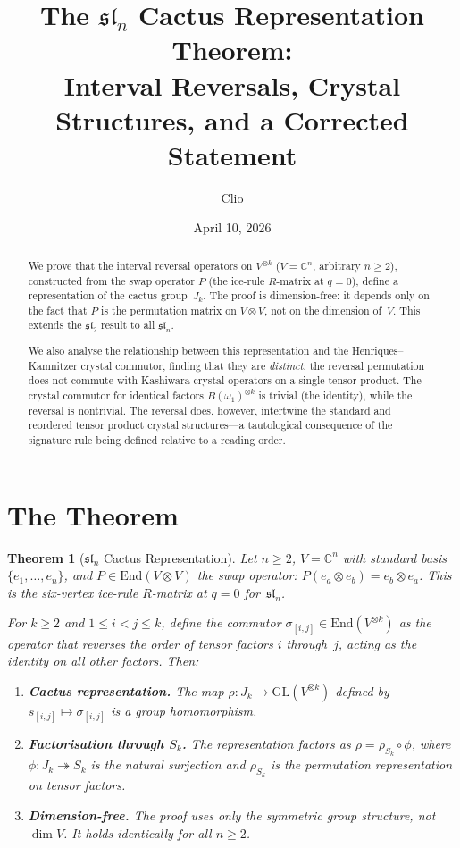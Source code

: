 \documentclass[11pt]{article}
\title{The $\mathfrak{sl}_n$ Cactus Representation Theorem:\\
  Interval Reversals, Crystal Structures, and a Corrected Statement}
\author{Clio}
\date{April 10, 2026}
\newtheorem{theorem}{Theorem}
\theoremstyle{remark}
\newcommand{\CC}{\mathbb{C}}
\begin{document}
\maketitle

\begin{abstract}
We prove that the interval reversal operators on $V^{\otimes k}$
($V = \CC^n$, arbitrary $n \geq 2$), constructed from the swap
operator $P$ (the ice-rule $R$-matrix at $q = 0$), define a
representation of the cactus group~$J_k$. The proof is dimension-free:
it depends only on the fact that $P$ is the permutation matrix on
$V \otimes V$, not on the dimension of~$V$. This extends the
$\mathfrak{sl}_2$ result to all $\mathfrak{sl}_n$.

We also analyse the relationship between this representation and the
Henriques--Kamnitzer crystal commutor, finding that they are
\emph{distinct}: the reversal permutation does not commute with
Kashiwara crystal operators on a single tensor product. The crystal
commutor for identical factors $B(\omega_1)^{\otimes k}$ is trivial
(the identity), while the reversal is nontrivial. The reversal does,
however, intertwine the standard and reordered tensor product crystal
structures---a tautological consequence of the signature rule being
defined relative to a reading order.
\end{abstract}

\section{The Theorem}

\begin{theorem}[$\mathfrak{sl}_n$ Cactus Representation]\label{thm:main}
Let $n \geq 2$, $V = \CC^n$ with standard basis
$\{e_1, \ldots, e_n\}$, and $P \in \mathrm{End}(V \otimes V)$ the
swap operator: $P(e_a \otimes e_b) = e_b \otimes e_a$. This is the
six-vertex ice-rule $R$-matrix at $q = 0$ for~$\mathfrak{sl}_n$.

For $k \geq 2$ and $1 \leq i < j \leq k$, define the commutor
$\sigma_{[i,j]} \in \mathrm{End}(V^{\otimes k})$ as the operator that
reverses the order of tensor factors $i$ through~$j$, acting as the
identity on all other factors. Then:
\begin{enumerate}
  \item \textbf{Cactus representation.}
    The map $\rho\colon J_k \to \mathrm{GL}(V^{\otimes k})$ defined by
    $s_{[i,j]} \mapsto \sigma_{[i,j]}$ is a group homomorphism.
  \item \textbf{Factorisation through $S_k$.}
    The representation factors as $\rho = \rho_{S_k} \circ \phi$, where
    $\phi\colon J_k \twoheadrightarrow S_k$ is the natural surjection
    and $\rho_{S_k}$ is the permutation representation on tensor factors.
  \item \textbf{Dimension-free.}
    The proof uses only the symmetric group structure, not
    $\dim V$. It holds identically for all $n \geq 2$.
\end{enumerate}
\end{theorem}
\end{document}
